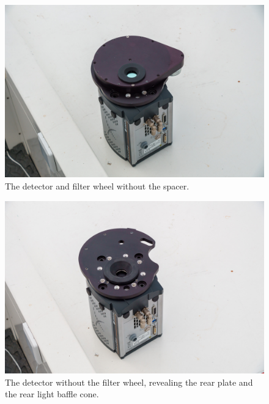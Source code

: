 \begin{figure}
\begin{center}
\includegraphics[width=0.8\linewidth]{figures/huitzi-f8-without-spacer.jpg}
\end{center}
\caption{The detector and filter wheel without the spacer.}
\label{figure:huitzi-f8-without-spacer}
\end{figure}

\begin{figure}
\begin{center}
\includegraphics[width=0.8\linewidth]{figures/huitzi-f8-without-filter-wheel.jpg}
\end{center}
\caption{The detector without the filter wheel, revealing the rear plate and the rear light baffle cone.} 
\label{figure:huitzi-f8-without-filter-wheel}
\end{figure}

